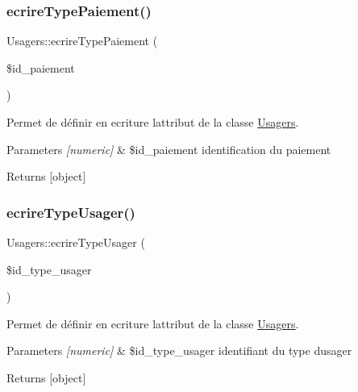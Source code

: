 \subsubsection{\texorpdfstring{ecrire\+Type\+Paiement()}{ecrireTypePaiement()}}
{\footnotesize\ttfamily Usagers\+::ecrire\+Type\+Paiement (\begin{DoxyParamCaption}\item[{}]{\$id\+\_\+paiement }\end{DoxyParamCaption})}



Permet de définir en ecriture l\textquotesingle{}attribut de la classe \hyperlink{class_usagers}{Usagers}. 


\begin{DoxyParams}{Parameters}
{\em \mbox{[}numeric\mbox{]}} & \$id\+\_\+paiement identification du paiement \\
\hline
\end{DoxyParams}
\begin{DoxyReturn}{Returns}
\mbox{[}object\mbox{]} 
\end{DoxyReturn}
\mbox{\label{class_usagers_adc3f6a6e24c34886437a8391612efabe}} 
\subsubsection{\texorpdfstring{ecrire\+Type\+Usager()}{ecrireTypeUsager()}}
{\footnotesize\ttfamily Usagers\+::ecrire\+Type\+Usager (\begin{DoxyParamCaption}\item[{}]{\$id\+\_\+type\+\_\+usager }\end{DoxyParamCaption})}



Permet de définir en ecriture l\textquotesingle{}attribut de la classe \hyperlink{class_usagers}{Usagers}. 


\begin{DoxyParams}{Parameters}
{\em \mbox{[}numeric\mbox{]}} & \$id\+\_\+type\+\_\+usager identifiant du type d\textquotesingle{}usager \\
\hline
\end{DoxyParams}
\begin{DoxyReturn}{Returns}
\mbox{[}object\mbox{]} 
\end{DoxyReturn}
\mbox{\label{class_usagers_a459db0ebe1c831d00aaff9fc46fdfa45}} 
